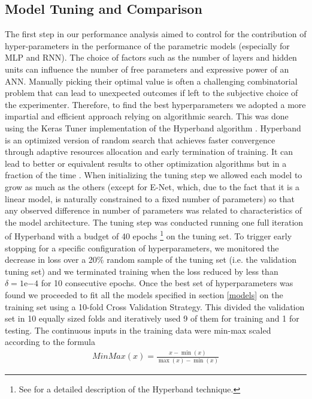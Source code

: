 \subsection{Model Tuning and Comparison}
The first step in our performance analysis aimed to control for the contribution of hyper-parameters in the performance of the parametric models (especially for MLP and RNN). The choice of factors such as the number of layers and hidden units can influence the number of free parameters and expressive power of an ANN. Manually picking their optimal value is often a challenging combinatorial problem that can lead to unexpected outcomes if left to the subjective choice of the experimenter. Therefore, to find the best hyperparameters we adopted a more impartial and efficient approach relying on algorithmic search. This was done using the Keras Tuner implementation \cite{omalley2019kerastuner} of the Hyperband algorithm \cite{li2017hyperband}. Hyperband is an optimized version of random search that achieves faster convergence through adaptive resources allocation and early termination of training. It can lead to better or equivalent results to other optimization algorithms but in a fraction of the time \cite{li2017hyperband}. When initializing the tuning step we allowed each model to grow as much as the others (except for E-Net, which,  due to the fact that it is a linear model, is naturally constrained to a fixed number of parameters) so that any observed difference in number of parameters was related to characteristics of the model architecture. The tuning step was conducted running one full iteration of Hyperband with a budget of 40 epochs \footnote{See  \cite{li2017hyperband,hyperwebs} for a detailed description of the Hyperband technique.} on the tuning set. To trigger early stopping for a specific configuration of hyperparameters, we monitored the decrease in loss over a 20\% random sample of the tuning set (i.e. the validation tuning set) and we terminated training when the loss reduced by less than $\delta = 1\mathrm{e}{-4}$ for 10 consecutive epochs. Once the best set of hyperparameters was found we proceeded to fit all the models specified in section \ref{models} on the training set using a 10-fold Cross Validation Strategy. This  divided the validation set in 10 equally sized folds and iteratively used 9 of them for training and 1 for testing. The continuous inputs in the training data were min-max scaled according to the formula
\begin{equation}
  \begin{gathered} 
  \label{min_max}
        MinMax(x) =\frac{x - \min(x)} {\max(x) - \min(x)} 
  \end{gathered}
\end{equation}
